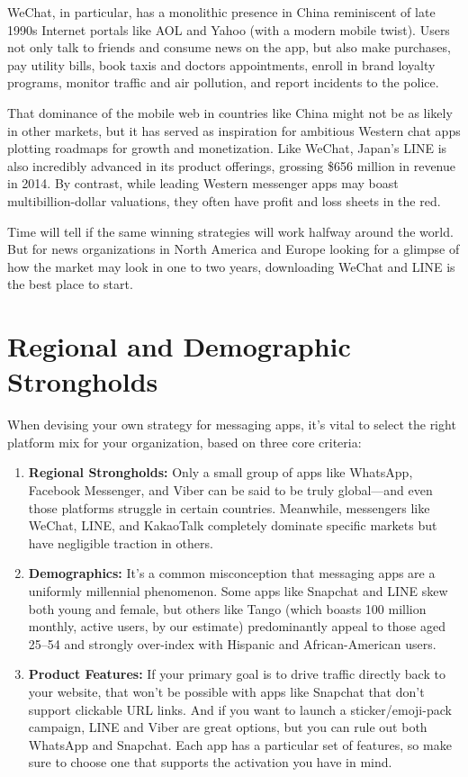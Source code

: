 \documentclass[notoc, symmetric, nobib, nols]{towcenter-guideto-book}
\begin{document}
WeChat, in particular, has a monolithic presence in China reminiscent of late 1990s Internet portals like AOL and Yahoo (with a modern mobile twist). Users not only talk to friends and consume news on the app, but also make purchases, pay utility bills, book taxis and doctors appointments, enroll in brand loyalty programs, monitor traffic and air pollution, and report incidents to the police.  

That dominance of the mobile web in countries like China might not be as likely in other markets, but it has served as inspiration for ambitious Western chat apps plotting roadmaps for growth and monetization. Like WeChat, Japan's LINE is also incredibly advanced in its product offerings, grossing \$656 million in revenue in 2014. By contrast, while leading Western messenger apps may boast multibillion-dollar valuations, they often have profit and loss sheets in the red.

Time will tell if the same winning strategies will work halfway around the world. But for news organizations in North America and Europe looking for a glimpse of how the market may look in one to two years, downloading WeChat and LINE is the best place to start. 

\section[Regional and Demographic Strongholds]{Regional and Demographic Strongholds}

When devising your own strategy for messaging apps, it's vital to select the right platform mix for your organization, based on three core criteria:

\begin{enumerate}[itemsep=1em]
\item\textbf{Regional Strongholds:} Only a small group of apps like WhatsApp, Facebook Messenger, and Viber can be said to be truly global---and even those platforms struggle in certain countries. Meanwhile, messengers like WeChat, LINE, and KakaoTalk completely dominate specific markets but have negligible traction in others.

\item\textbf{Demographics:} It's a common misconception that messaging apps are a uniformly millennial phenomenon. Some apps like Snapchat and LINE skew both young and female, but others like Tango (which boasts 100 million monthly, active users, by our estimate) predominantly appeal to those aged 25--54 and strongly over-index with Hispanic and African-American users.  

\item\textbf{Product Features:} If your primary goal is to drive traffic directly back to your website, that won't be possible with apps like Snapchat that don't support clickable URL links. And if you want to launch a sticker/emoji-pack campaign, LINE and Viber are great options, but you can rule out both WhatsApp and Snapchat. Each app has a particular set of features, so make sure to choose one that supports the activation you have in mind.\end{enumerate}
\end{document}
